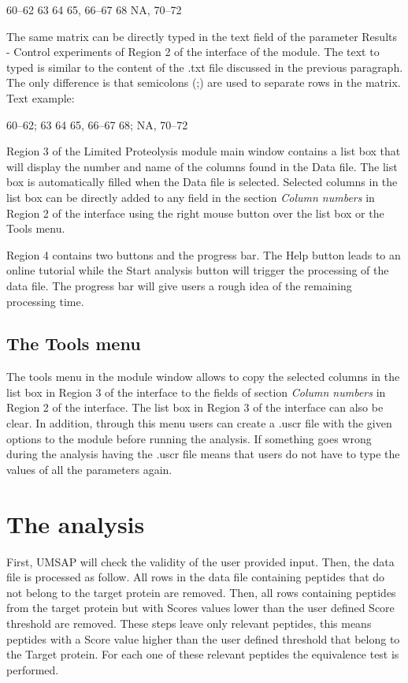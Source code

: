 \numrange[range-phrase=--]{60}{62}\newline
\num{63} \num{64} \num{65}, \numrange[range-phrase=--]{66}{67} \num{68}\newline
NA, \numrange[range-phrase=--]{70}{72} 

The same matrix can be directly typed in the text field of the parameter Results - Control experiments of Region \num{2} of the interface of the module. The text to typed is similar to the content of the .txt file discussed in the previous paragraph. The only difference is that semicolons (;) are used to separate rows in the matrix. Text example:

\numrange[range-phrase=--]{60}{62}; \num{63} \num{64} \num{65}, \numrange[range-phrase=--]{66}{67} \num{68}; NA, \numrange[range-phrase=--]{70}{72}

Region \num{3} of the Limited Proteolysis module main window contains a list box that will display the number and name of the columns found in the Data file. The list box is automatically filled when the Data file is selected. Selected columns in the list box can be directly added to any field in the section \textit{Column numbers} in Region \num{2} of the interface using the right mouse button over the list box or the Tools menu.

Region \num{4} contains two buttons and the progress bar. The Help button leads to an online tutorial while the Start analysis button will trigger the processing of the data file. The progress bar will give users a rough idea of the remaining processing time.

\subsection{The Tools menu}

The tools menu in the module window allows to copy the selected columns in the list box in Region \num{3} of the interface to the fields of section \textit{Column numbers} in Region \num{2} of the interface. The list box in Region \num{3} of the interface can also be clear. In addition, through this menu users can create a .uscr file with the given options to the module before running the analysis. If something goes wrong during the analysis having the .uscr file means that users do not have to type the values of all the parameters again.   

\section{The analysis}
\label{sec:limprotEquivalenceTest}
First, UMSAP will check the validity of the user provided input. Then, the data file is processed as follow. All rows in the data file containing peptides that do not belong to the target protein are removed. Then, all rows containing peptides from the target protein but with Scores values lower than the user defined Score threshold are removed. These steps leave only relevant peptides, this means peptides with a Score value higher than the user defined threshold that belong to the Target protein. For each one of these relevant peptides the equivalence test is performed\cite{Limentani2005}.

